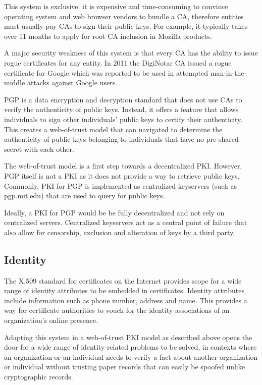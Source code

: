 \documentclass[12pt,a4paper]{report}
\begin{document}
	This system is exclusive; it is expensive and time-consuming to convince operating system and web browser vendors to bundle a CA, therefore entities must usually pay CAs to sign their public keys. For example, it typically takes over 11 months to apply for root CA inclusion in Mozilla products\cite{6}.
	 
	A major security weakness of this system is that every CA has the ability to issue rogue certificates for any entity. In 2011 the DigiNotar CA issued a rogue certificate for Google which was reported to be used in attempted man-in-the-middle attacks against Google users\cite{7}.

	PGP is a data encryption and decryption standard that does not use CAs to verify the authenticity of public keys. Instead, it offers a feature that allows individuals to sign other individuals' public keys to certify their authenticity. This creates a web-of-trust model that can navigated to determine the authenticity of public keys belonging to individuals that have no pre-shared secret with each other.\cite{2}

	The web-of-trust model is a first step towards a decentralized PKI. However, PGP itself is not a PKI as it does not provide a way to retrieve public keys. Commonly, PKI for PGP is implemented as centralized keyservers (such as pgp.mit.edu) that are used to query for public keys.

	Ideally, a PKI for PGP would be be fully decentralized and not rely on centralized servers. Centralized keyservers act as a central point of failure that also allow for censorship, exclusion and alteration of keys by a third party.
	
	\subsection{Identity}
	The X.509 standard for certificates on the Internet provides scope for a wide range of identity attributes to be embedded in certificates.\cite{8} Identity attributes include information such as phone number, address and name. This provides a way for certificate authorities to vouch for the identity associations of an organization's online presence.
	
	Adapting this system in a web-of-trust PKI model as described above opens the door for a wide range of identity-related problems to be solved, in contexts where an organization or an individual needs to verify a fact about another organization or individual without trusting paper records that can easily be spoofed unlike cryptographic records.
	
\end{document}
